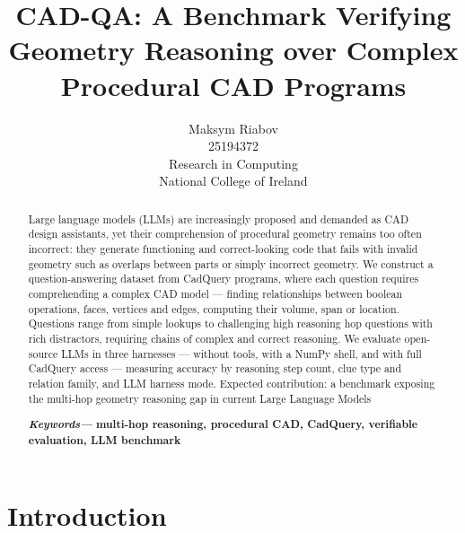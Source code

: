 \documentclass[10pt]{article}
\providecommand{\keywords}[1]
{
  \small
  \textbf{\textit{Keywords---}} #1
}
\begin{document}
\title{\bf{CAD-QA: A Benchmark Verifying Geometry Reasoning over Complex Procedural CAD Programs}}%
\author{Maksym Riabov \\ 25194372 \\ Research in Computing \\ National College of Ireland}%

\date{}%
\maketitle


\begin{abstract}
Large language models (LLMs) are increasingly proposed and demanded as CAD
design assistants, yet their comprehension of procedural geometry remains
too often incorrect: they generate functioning and correct-looking
code that fails with invalid geometry such as overlaps between
parts or simply incorrect geometry. We construct a
question-answering dataset from CadQuery programs, where each question requires
comprehending a complex CAD model --- finding relationships between boolean
operations, faces, vertices and edges, computing their volume, span or
location. Questions range from simple lookups to challenging high reasoning hop
questions with rich distractors, requiring chains of complex and correct reasoning.
We evaluate open-source LLMs in three harnesses --- without tools, with a NumPy shell, and with full CadQuery access --- measuring accuracy by reasoning step count, clue type and relation family, and LLM harness mode.
Expected contribution: a benchmark exposing
the multi-hop geometry reasoning gap in current Large Language Models

\keywords{\textbf{multi-hop reasoning, procedural CAD, CadQuery, verifiable evaluation, LLM benchmark}}
\end{abstract}


\section{Introduction}
\end{document}
